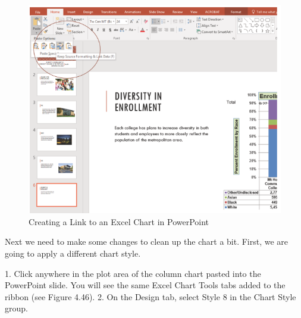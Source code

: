 \begin{figure}[H]
	\centering
	\includegraphics[width=\maxwidth{.95\linewidth}]{gfx/ch04_fig48}
	\caption{Creating a Link to an Excel Chart in PowerPoint}
	\label{04:fig48}
\end{figure}


Next we need to make some changes to clean up the chart a bit. First, we are going to apply a different
chart style.

1. Click anywhere in the plot area of the column chart pasted into the PowerPoint slide. You will
see the same Excel Chart Tools tabs added to the ribbon (see Figure 4.46).
2. On the Design tab, select Style 8 in the Chart Style group.


